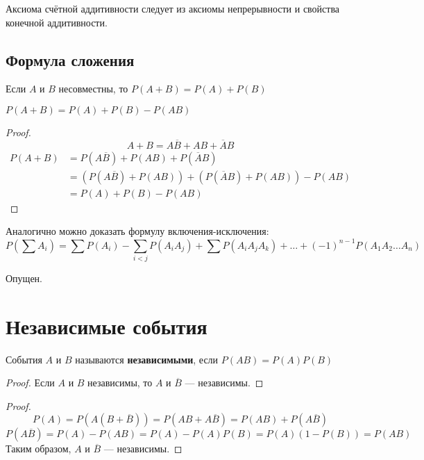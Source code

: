 \documentclass[12pt, a4paper, oneside]{book}
\begin{document}
\begin{remark}
    Аксиома счётной аддитивности следует из аксиомы непрерывности и свойства конечной аддитивности.
\end{remark}

\subsection{Формула сложения}

Если \(A\) и \(B\) несовместны, то \(P(A + B) = P(A) + P(B)\)

\begin{theorem}
    \(P(A + B) = P(A) + P(B) - P(A B)\)
\end{theorem}
\begin{proof}
    \[A + B = A\overline B + AB + \overline A B\]
    \begin{align*}
        P(A + B) & = P(A\overline B) + P(AB) + P(\overline A B)                     \\
                 & = (P(A\overline B) + P(AB)) + (P(\overline A B) + P(AB)) - P(AB) \\
                 & = P(A) + P(B) - P(AB)
    \end{align*}
\end{proof}

Аналогично можно доказать формулу включения-исключения:
\[P\left(\sum A_i\right) = \sum P(A_i) - \sum_{i < j} P(A_i A_j) + \sum P(A_i A_j A_k) + \dots + ( - 1)^{n - 1} P(A_1 A_2 \dots A_n)\]

\begin{example}
    Опущен.
\end{example}

\section{Независимые события}

\begin{definition}
    События \(A\) и \(B\) называются \textbf{независимыми}, если \(P(AB) = P(A)P(B)\)
\end{definition}

\begin{proof}
    Если \(A\) и \(B\) независимы, то \(A\) и \(\overline{B}\) --- независимы.
\end{proof}
\begin{proof}
    \[P(A) = P(A(B + \overline B)) = P(AB + A\overline B) = P(AB) + P(A\overline B)\]
    \[P(A \overline B) = P(A) - P(AB) = P(A) - P(A)P(B) = P(A)(1 - P(B)) = P(AB)\]
    Таким образом, \(A\) и \(\overline{B}\) --- независимы.
\end{proof}
\end{document}
